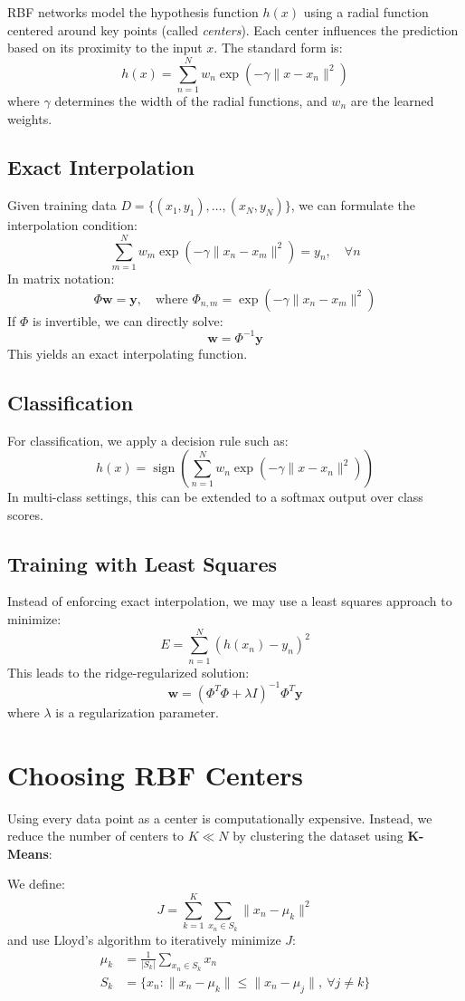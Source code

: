 \documentclass[twocolumn]{article} %
\begin{document}
RBF networks model the hypothesis function $h(x)$ using a radial function centered around key points (called \emph{centers}). Each center influences the prediction based on its proximity to the input $x$. The standard form is:
\[
h(x) = \sum_{n=1}^N w_n\exp\left(-\gamma\| x - x_n \|^2\right)
\]
where $\gamma$ determines the width of the radial functions, and $w_n$ are the learned weights.

\subsection{Exact Interpolation}
Given training data $D = \{(x_1, y_1), \dots, (x_N, y_N)\}$, we can formulate the interpolation condition:
\[
\sum_{m=1}^N w_m\exp\left(-\gamma\| x_n - x_m \|^2\right) = y_n, \quad \forall n
\]
In matrix notation:
\[
\Phi \mathbf{w} = \mathbf{y}, \quad \text{where } \Phi_{n,m} = \exp\left(-\gamma\|x_n - x_m\|^2\right)
\]
If $\Phi$ is invertible, we can directly solve:
\[
\mathbf{w} = \Phi^{-1} \mathbf{y}
\]
This yields an exact interpolating function.

\subsection{Classification}
For classification, we apply a decision rule such as:
\[
h(x) = \operatorname{sign}\left(\sum_{n=1}^N w_n\exp(-\gamma\|x - x_n\|^2)\right)
\]
In multi-class settings, this can be extended to a softmax output over class scores.

\subsection{Training with Least Squares}
Instead of enforcing exact interpolation, we may use a least squares approach to minimize:
\[
E = \sum_{n=1}^N (h(x_n) - y_n)^2
\]
This leads to the ridge-regularized solution:
\[
\mathbf{w} = (\Phi^T\Phi + \lambda I)^{-1}\Phi^T \mathbf{y}
\]
where $\lambda$ is a regularization parameter.

\section{Choosing RBF Centers}
Using every data point as a center is computationally expensive. Instead, we reduce the number of centers to $K \ll N$ by clustering the dataset using \textbf{K-Means}:

We define:
\[
J = \sum_{k=1}^K \sum_{x_n \in S_k} \| x_n - \mu_k \|^2
\]
and use Lloyd's algorithm to iteratively minimize $J$:
\begin{align*}
\mu_k &= \frac{1}{|S_k|}\sum_{x_n \in S_k} x_n \\
S_k &= \{ x_n : \|x_n - \mu_k\| \leq \|x_n - \mu_j\|,\ \forall j \neq k \}
\end{align*}
\end{document}
